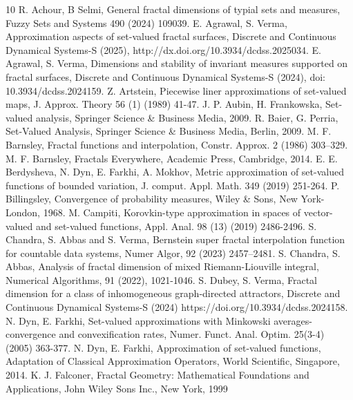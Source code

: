 \documentclass[12pt,oneside,reqno]{amsart}
\theoremstyle{definition}
\theoremstyle{remark}
\begin{document}

\begin{thebibliography}{10}
 R. Achour, B Selmi, General fractal dimensions of typial sets and measures, Fuzzy Sets and Systems 490 (2024) 109039.
 E. Agrawal, S. Verma, Approximation aspects of set-valued fractal surfaces, Discrete and Continuous Dynamical Systems-S (2025), http://dx.doi.org/10.3934/dcdss.2025034.
 E. Agrawal, S. Verma, Dimensions and stability of invariant measures supported on fractal surfaces,
Discrete and Continuous Dynamical Systems-S (2024), doi: 10.3934/dcdss.2024159.  Z. Artstein, Piecewise liner approximations of set-valued maps, J. Approx. Theory 56 (1) (1989) 41-47.
 J. P. Aubin, H. Frankowska, Set-valued analysis, Springer Science \& Business Media, 2009.
 R. Baier, G. Perria, Set-Valued Analysis, Springer Science \& Business Media, Berlin, 2009.
 M. F. Barnsley, Fractal functions and interpolation, Constr. Approx. 2 (1986) 303–329.
 M. F. Barnsley, Fractals Everywhere, Academic Press, Cambridge, 2014.
 E. E. Berdysheva, N. Dyn, E. Farkhi, A. Mokhov, Metric approximation of set-valued functions of bounded variation, J. comput. Appl. Math. 349 (2019) 251-264.
 P. Billingsley, Convergence of probability measures, Wiley \& Sons, New York-London, 1968.
 M. Campiti, Korovkin-type approximation in spaces of vector-valued and set-valued functions, Appl. Anal. 98 (13) (2019) 2486-2496.
 S. Chandra, S. Abbas and S. Verma, Bernstein super fractal interpolation function for countable data systems, Numer Algor, 92 (2023) 2457–2481.
 S. Chandra, S. Abbas, Analysis of fractal dimension of mixed Riemann-Liouville integral, Numerical Algorithms, 91 (2022), 1021-1046.
 S. Dubey, S. Verma, Fractal dimension for a class of inhomogeneous graph-directed attractors, Discrete and Continuous Dynamical Systems-S (2024) https://doi.org/10.3934/dcdss.2024158.
 N. Dyn, E. Farkhi, Set-valued approximations with Minkowski averages-convergence and convexification rates, Numer. Funct. Anal. Optim. 25(3-4) (2005) 363-377.
 N. Dyn, E. Farkhi, Approximation of set-valued functions, Adaptation of Classical Approximation Operators, World Scientific, Singapore, 2014.
 K. J. Falconer, Fractal Geometry: Mathematical Foundations and Applications, John Wiley Sons Inc., New York, 1999


\end{thebibliography}
\end{document}
